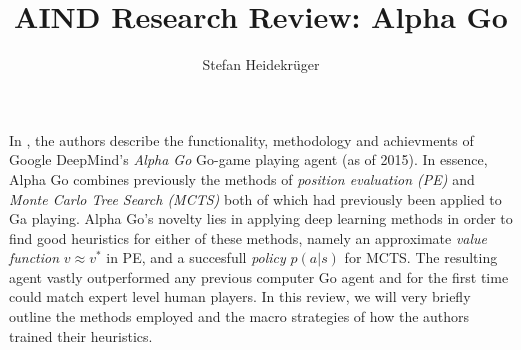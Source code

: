\documentclass{article}
\title{AIND Research Review: Alpha Go}
\author{Stefan Heidekrüger}
\theoremstyle{plain}
\theoremstyle{definition}
\theoremstyle{remark}
\begin{document}
\maketitle

In \cite{silver2016mastering}, the authors describe the functionality, methodology and achievments of Google DeepMind's \emph{Alpha Go} Go-game playing agent (as of 2015). In essence, Alpha Go combines previously the methods of \emph{position evaluation (PE)} and \emph{Monte Carlo Tree Search (MCTS)} \textemdash both of which had previously been applied to Ga playing. Alpha Go's novelty lies in applying deep learning methods in order to find good heuristics for either of these methods, namely an approximate \emph{value function} $v \approx v^*$ in PE, and a succesfull \emph{policy} $p(a|s)$ for MCTS. The resulting agent vastly outperformed any previous computer Go agent and for the first time could match expert level human players.
In this review, we will very briefly outline the methods employed and the macro strategies of how the authors trained their heuristics.
\end{document}
